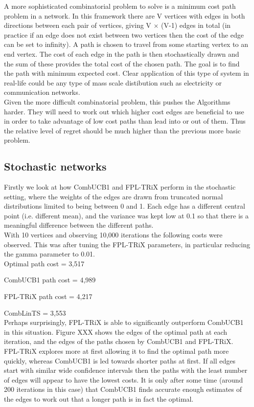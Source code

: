 A more sophisticated combinatorial problem to solve is a minimum cost path problem in a network. In this framework there are V vertices with edges in both directions between each pair of vertices, giving V $\times$ (V-1) edges in total (in practice if an edge does not exist between two vertices then the cost of the edge can be set to infinity). A path is chosen to travel from some starting vertex to an end vertex. The cost of each edge in the path is then stochastically drawn and the sum of these provides the total cost of the chosen path. The goal is to find the path with minimum expected cost. Clear application of this type of system in real-life could be any type of mass scale distibution such as electricity or communication networks.\\

Given the more difficult combinatorial problem, this pushes the Algorithms harder. They will need to work out which higher cost edges are beneficial to use in order to take advantage of low cost paths than lead into or out of them. Thus the relative level of regret should be much higher than the previous more basic problem.\\

\subsection{Stochastic networks}

Firstly we look at how CombUCB1 and FPL-TRiX perform in the stochastic setting, where the weights of the edges are drawn from truncated normal distributions limited to being between 0 and 1. Each edge has a different central point (i.e. different mean), and the variance was kept low at 0.1 so that there is a meaningful difference between the different paths.\\

With 10 vertices and observing 10,000 iterations the following costs were observed. This was after tuning the FPL-TRiX parameters, in particular reducing the gamma parameter to 0.01.\\

Optimal path cost = 3,517

CombUCB1 path cost = 4,989

FPL-TRiX path cost = 4,217

CombLinTS = 3,553\\

Perhaps surprisingly, FPL-TRiX is able to significantly outperform CombUCB1 in this situation. Figure XXX shows the edges of the optimal path at each iteration, and the edges of the paths chosen by CombUCB1 and FPL-TRiX. FPL-TRiX explores more at first allowing it to find the optimal path more quickly, whereas CombUCB1 is led towards shorter paths at first. If all edges start with similar wide confidence intervals then the paths with the least number of edges will appear to have the lowest costs. It is only after some time (around 200 iterations in this case) that CombUCB1 finds accurate enough estimates of the edges to work out that a longer path is in fact the optimal.\\

